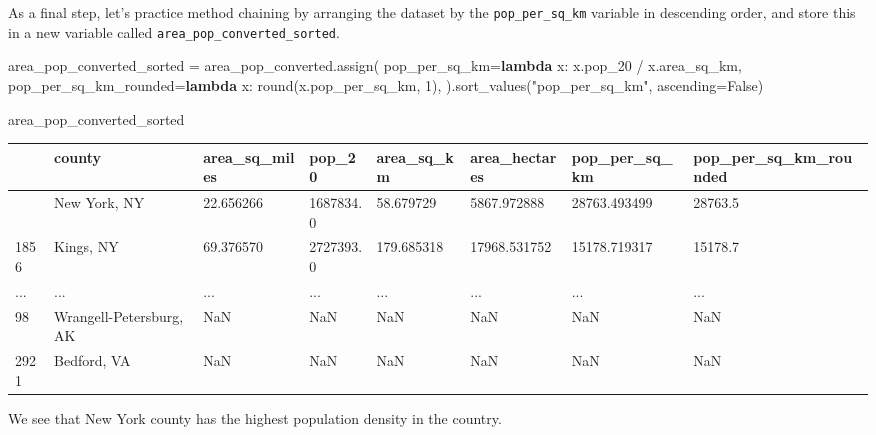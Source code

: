 \documentclass[
  letterpaper,
  DIV=11,
  numbers=noendperiod]{scrreprt}
\newenvironment{Shaded}{\begin{snugshade}}{\end{snugshade}}
\newcommand{\BuiltInTok}[1]{\textcolor[rgb]{0.00,0.23,0.31}{#1}}
\newcommand{\DecValTok}[1]{\textcolor[rgb]{0.68,0.00,0.00}{#1}}
\newcommand{\KeywordTok}[1]{\textcolor[rgb]{0.00,0.23,0.31}{\textbf{#1}}}
\newcommand{\NormalTok}[1]{\textcolor[rgb]{0.00,0.23,0.31}{#1}}
\newcommand{\OperatorTok}[1]{\textcolor[rgb]{0.37,0.37,0.37}{#1}}
\newcommand{\StringTok}[1]{\textcolor[rgb]{0.13,0.47,0.30}{#1}}
\newcommand{\VariableTok}[1]{\textcolor[rgb]{0.07,0.07,0.07}{#1}}
\begin{document}
As a final step, let's practice method chaining by arranging the dataset
by the \texttt{pop\_per\_sq\_km} variable in descending order, and store
this in a new variable called \texttt{area\_pop\_converted\_sorted}.

\begin{Shaded}
\begin{Highlighting}[]
\NormalTok{area\_pop\_converted\_sorted }\OperatorTok{=}\NormalTok{ area\_pop\_converted.assign(}
\NormalTok{    pop\_per\_sq\_km}\OperatorTok{=}\KeywordTok{lambda}\NormalTok{ x: x.pop\_20 }\OperatorTok{/}\NormalTok{ x.area\_sq\_km,}
\NormalTok{    pop\_per\_sq\_km\_rounded}\OperatorTok{=}\KeywordTok{lambda}\NormalTok{ x: }\BuiltInTok{round}\NormalTok{(x.pop\_per\_sq\_km, }\DecValTok{1}\NormalTok{),}
\NormalTok{).sort\_values(}\StringTok{"pop\_per\_sq\_km"}\NormalTok{, ascending}\OperatorTok{=}\VariableTok{False}\NormalTok{)}

\NormalTok{area\_pop\_converted\_sorted}
\end{Highlighting}
\end{Shaded}

\begin{longtable}[]{@{}llllllll@{}}
\toprule\noalign{}
& county & area\_sq\_miles & pop\_20 & area\_sq\_km & area\_hectares &
pop\_per\_sq\_km & pop\_per\_sq\_km\_rounded \\
\midrule\noalign{}
\endhead
\bottomrule\noalign{}
\endlastfoot
1863 & New York, NY & 22.656266 & 1687834.0 & 58.679729 & 5867.972888 &
28763.493499 & 28763.5 \\
1856 & Kings, NY & 69.376570 & 2727393.0 & 179.685318 & 17968.531752 &
15178.719317 & 15178.7 \\
... & ... & ... & ... & ... & ... & ... & ... \\
98 & Wrangell-Petersburg, AK & NaN & NaN & NaN & NaN & NaN & NaN \\
2921 & Bedford, VA & NaN & NaN & NaN & NaN & NaN & NaN \\
\end{longtable}

We see that New York county has the highest population density in the
country.
\end{document}
